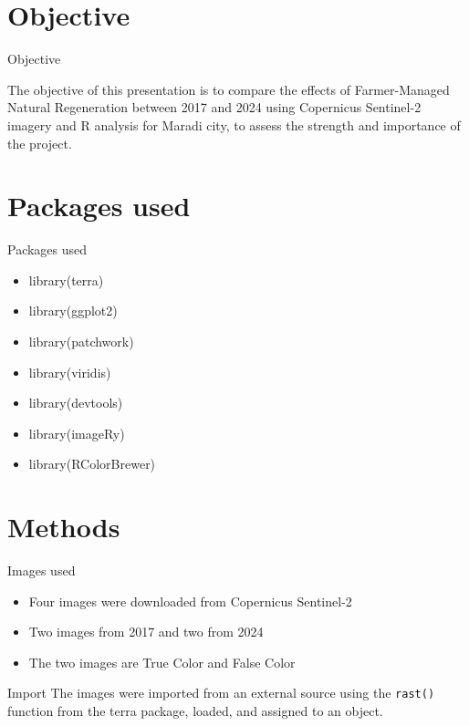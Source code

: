 \documentclass{beamer}
\begin{document}
\section{Objective}

\begin{frame}{Objective}

The objective of this presentation is to compare the effects of Farmer-Managed Natural Regeneration between 2017 and 2024 using Copernicus Sentinel-2 imagery and R analysis for Maradi city, to assess the strength and importance of the project.
    
\end{frame}

\section{Packages used}
\begin{frame}{Packages used}
    \begin{itemize}
    
    \item library(terra)
    \item library(ggplot2)
    \item library(patchwork)
    \item library(viridis)
    \item library(devtools)
    \item library(imageRy)
    \item library(RColorBrewer)

\end{itemize}
\end{frame}

\section{Methods}
\begin{frame}{Images used}
\begin{itemize}
    \item Four images were downloaded from Copernicus Sentinel-2
    \item Two images from 2017 and two from 2024
    \item The two images are True Color and False Color 
\end{itemize}
\end{frame}

\begin{frame}{Import}
The images were imported from an external source using the \texttt{rast()} function from the terra package, loaded, and assigned to an object.

      

\end{frame}
\end{document}
